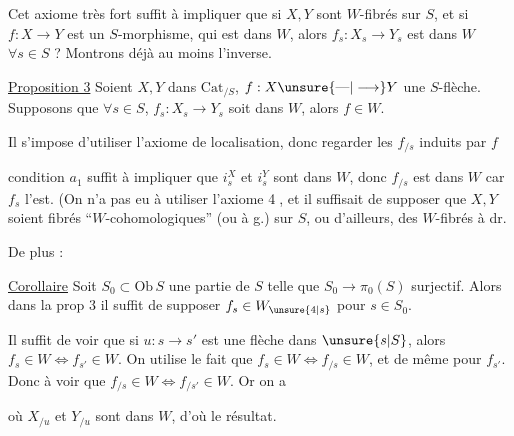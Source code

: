 Cet axiome très fort suffit à impliquer que si $X,Y$ sont $W$-fibrés sur $S$, et si $f:X\longrightarrow Y$ est un $S$-morphisme, qui est dans $W$, alors $f_s:X_s\longrightarrow Y_s$ est dans $W$ $\forall s\in S$ ? Montrons déjà au moins l'inverse.



\uline{Proposition 3} Soient $X,Y$ dans $\mathrm{Cat}_{/S}$, $f:X\unsure{\text{---}|\longrightarrow}Y$ une $S$-flèche. Supposons  que $\forall s\in S$, $f_s:X_s\longrightarrow Y_s$ soit  dans $W$, alors $f\in W$.

Il s'impose d'utiliser l'axiome de localisation, donc regarder les $f_{/s}$ induits par $f$

 condition $a_1$ suffit à impliquer que  $i_s^X$ et $i_s^Y$ sont dans $W$, donc $f_{/s}$ est dans $W$ car $f_s$ l'est. (On n'a pas eu à utiliser l'axiome \textcircled{4}, et il suffisait de supposer que $X,Y$ soient fibrés ``$W$-cohomologiques''  (ou  à g.) sur $S$, ou d'ailleurs, des $W$-fibrés à dr.

De plus :

\uline{Corollaire}  Soit $S_0\subset\mathrm{Ob}\,S$ une partie de $S$ telle que $S_0\longrightarrow\pi_0(S)$ surjectif. Alors dans la prop 3 il suffit de supposer $f_s\in W_{\unsure{4|s}}$ pour $s\in S_0$.


Il suffit de voir que si $u:s\longrightarrow s'$ est une flèche dans $\unsure{s|S}$, alors $f_s\in W\Longleftrightarrow f_{s'}\in W$. On utilise le fait que $f_s\in W\Longleftrightarrow f_{/s}\in W$, et de même pour $f_{s'}$. Donc à voir que $f_{/s}\in W\Longleftrightarrow f_{/s'}\in W$. Or on a

où $X_{/u}$ et $Y_{/u}$ sont dans $W$, d'où le résultat.

